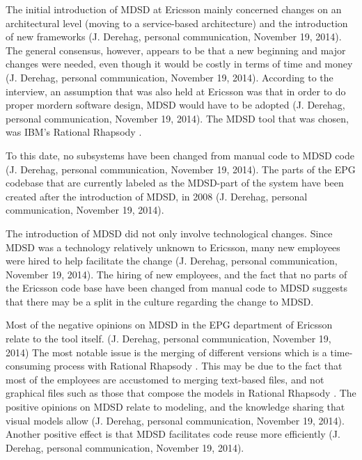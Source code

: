 \documentclass[final_report_innit.tex]{subfiles}
\begin{document}
The initial introduction of MDSD at Ericsson mainly concerned changes on an architectural level (moving to a service-based architecture) and the introduction of new frameworks (J. Derehag, personal communication, November 19, 2014). The general consensus, however, appears to be that a new beginning and major changes were needed, even though it would be costly in terms of time and money (J. Derehag, personal communication, November 19, 2014). According to the interview, an assumption that was also held at Ericsson was that in order to do proper mordern software design, MDSD would have to be adopted (J. Derehag, personal communication, November 19, 2014). The MDSD tool that was chosen, was IBM’s Rational Rhapsody \cite{rrf}.

To this date, no subsystems have been changed from manual code to MDSD code (J. Derehag, personal communication, November 19, 2014). The parts of the EPG codebase that are currently labeled as the MDSD-part of the system have been created after the introduction of MDSD, in 2008 (J. Derehag, personal communication, November 19, 2014). 

The introduction of MDSD did not only involve technological changes. Since MDSD was a technology relatively unknown to Ericsson, many new employees were hired to help facilitate the change (J. Derehag, personal communication, November 19, 2014). The hiring of new employees, and the fact that no parts of the Ericsson code base have been changed from manual code to MDSD suggests that there may be a split in the culture regarding the change to MDSD. 

Most of the negative opinions on MDSD in the EPG department of Ericsson relate to the tool \cite{rrf} itself. (J. Derehag, personal communication, November 19, 2014) The most notable issue is the merging of different versions which is a time-consuming process with Rational Rhapsody \cite{rrf}. This may be due to the fact that most of the employees are accustomed to merging text-based files, and not graphical files such as those that compose the models in Rational Rhapsody \cite{rrf}. The positive opinions on MDSD relate to modeling, and the knowledge sharing that visual models allow (J. Derehag, personal communication, November 19, 2014). Another positive effect is that MDSD facilitates code reuse more efficiently (J. Derehag, personal communication, November 19, 2014). 
\end{document}
